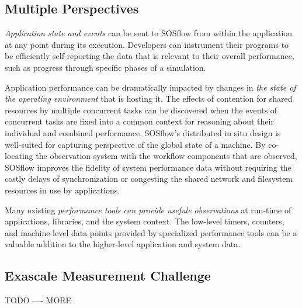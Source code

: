 \subsection{Multiple Perspectives} %
%
\textit{Application state and events} can be sent to SOSflow from
within the application at any point during its execution.
%
Developers can instrument their programs to be efficiently self-reporting
the data that is relevant to their overall performance, such as progress
through specific phases of a simulation.
%
\par
%

Application performance can be dramatically impacted by changes in
\textit{the state of the operating environment} that is hosting it.
%
The effects of contention for shared resources by multiple concurrent
tasks can be discovered when the events of concurrent tasks are fixed
into a common context for reasoning about their individual and
combined performance.
%
SOSflow's distributed in situ design is well-suited for capturing
perspective of the global state of a machine.
%
By co-locating the observation system with the workflow components
that are observed, SOSflow improves the fidelity of system performance
data without requiring the costly delays of synchronization or
congesting the shared network and filesystem resources in use by
applications.
%
\par
%
Many existing \textit{performance tools can provide usefule
  observations} at run-time of applications, libraries, and the system
context.
%
The low-level timers, counters, and machine-level data points provided
by specialized performance tools can be a valuable addition to the
higher-level application and system data.
%
\subsection{Exascale Measurement Challenge} %
%
TODO ---- MORE
%




